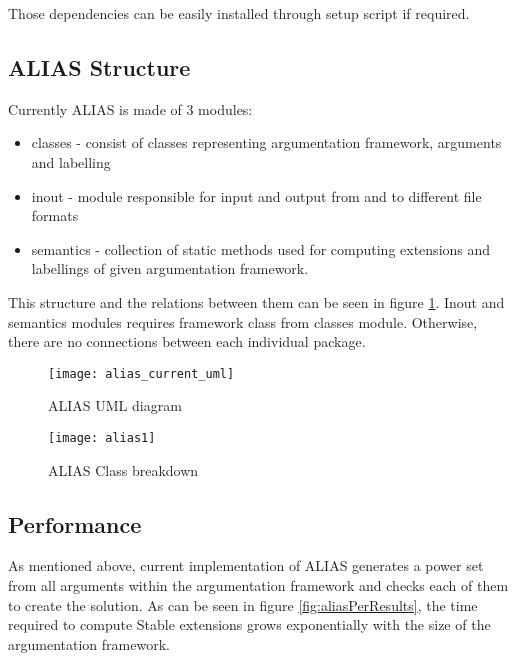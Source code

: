 Those dependencies can be easily installed through setup script if required. 

\subsection{ALIAS Structure}
Currently ALIAS is made of 3 modules: 

\begin{itemize}
	\item classes - consist of classes representing argumentation framework, arguments and labelling
	\item inout - module responsible for input and output from and to different file formats
	\item semantics - collection of static methods used for computing extensions and labellings of given argumentation framework.
\end{itemize}

This structure and the relations between them can be seen in figure \ref{fig:aliasUml1}. Inout and semantics modules requires framework class from classes module. Otherwise, there are no connections between each individual package.

\begin{figure}[h]
	\texttt{[image: alias\_current\_uml]}
	\caption{ALIAS UML diagram}
	\label{fig:aliasUml1}
\end{figure}



\begin{landscape}
	\begin{figure}
		\texttt{[image: alias1]}
		\caption{ALIAS Class breakdown}
		\label{fig:aliasClassBreakdown}
	\end{figure}
\end{landscape}

\subsection{Performance}
As mentioned above, current implementation of ALIAS generates a power set from all arguments within the argumentation framework and checks each of them to create the solution. As can be seen in figure \ref{fig:aliasPerResults}, the time required to compute Stable extensions grows exponentially with the size of the argumentation framework. 

